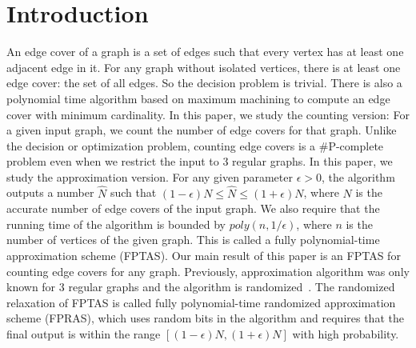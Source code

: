 \section{Introduction}
An edge cover of a graph is a set of edges such that every vertex has at least one adjacent edge in it.
 For any graph without isolated vertices, there is at least one edge cover: the set of all edges. So the decision problem is trivial. There is also a polynomial time algorithm based on maximum machining to compute an edge cover with minimum cardinality.     In this paper, we study the counting version:
 For a given input graph, we count the number of edge covers for that graph. Unlike the decision or optimization problem, counting edge covers is a \#P-complete problem even when we restrict the input to 3 regular graphs. In this paper, we study the approximation version. For any given parameter $\epsilon>0$, the algorithm outputs a number $\hat{N}$ such that $(1-\epsilon) N\leq \hat{N} \leq (1+\epsilon) N$, where $N$ is the accurate number of edge covers of the input graph. We also require that the running time of the algorithm is bounded by $poly(n,1/\epsilon)$, where $n$ is the number of vertices of the given graph. This is called a fully polynomial-time approximation scheme (FPTAS). Our main result of this paper is an FPTAS for counting edge covers for any graph. Previously, approximation algorithm was only known for 3 regular graphs and the algorithm is randomized~\cite{MFCS09}. The randomized relaxation of FPTAS is called fully polynomial-time randomized approximation scheme (FPRAS), which uses random bits in the algorithm and requires that the final output is within the range $[(1-\epsilon) N, (1+\epsilon) N]$ with high probability.

